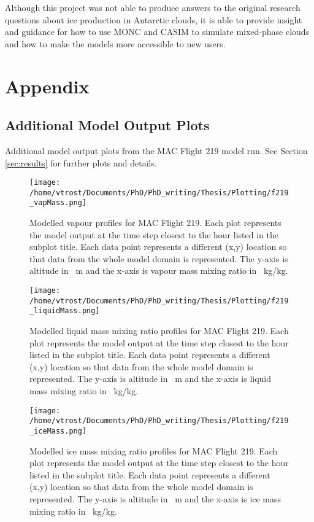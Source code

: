 Although this project was not able to produce answers to the original research questions about ice production in Antarctic clouds, it is able to provide insight and guidance for how to use MONC and CASIM to simulate mixed-phase clouds and how to make the models more accessible to new users.

\chapter{Appendix}
\section{Additional Model Output Plots} \label{ap:outputs}
Additional model output plots from the MAC Flight 219 model run. See Section \ref{sec:results} for further plots and details.
\newpage
\begin{figure}[H]
	\centering
	\texttt{[image: /home/vtrost/Documents/PhD/PhD\_writing/Thesis/Plotting/f219\_vapMass.png]}
	\caption{Modelled vapour profiles for MAC Flight 219. Each plot represents the model output at the time step closest to the hour listed in the subplot title. Each data point represents a different (x,y) location so that data from the whole model domain is represented. The y-axis is altitude in \SI{}{m} and the x-axis is vapour mass mixing ratio in \SI{}{kg/kg}.}
	\label{fig:moncVap}
\end{figure}

\begin{figure}[H]
	\centering
	\texttt{[image: /home/vtrost/Documents/PhD/PhD\_writing/Thesis/Plotting/f219\_liquidMass.png]}
	\caption{Modelled liquid mass mixing ratio profiles for MAC Flight 219. Each plot represents the model output at the time step closest to the hour listed in the subplot title. Each data point represents a different (x,y) location so that data from the whole model domain is represented. The y-axis is altitude in \SI{}{m} and the x-axis is liquid mass mixing ratio in \SI{}{kg/kg}.}
\end{figure}

\begin{figure}[H]
	\centering
	\texttt{[image: /home/vtrost/Documents/PhD/PhD\_writing/Thesis/Plotting/f219\_iceMass.png]}
	\caption{Modelled ice mass mixing ratio profiles for MAC Flight 219. Each plot represents the model output at the time step closest to the hour listed in the subplot title. Each data point represents a different (x,y) location so that data from the whole model domain is represented. The y-axis is altitude in \SI{}{m} and the x-axis is ice mass mixing ratio in \SI{}{kg/kg}.}
\end{figure}

